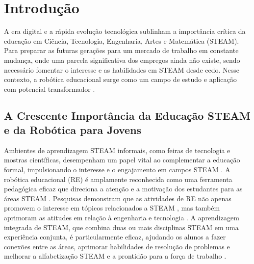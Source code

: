 \documentclass[%
  12pt,%
  a4paper,%
  oneside,%
  openright,%
  sumario = abnt-6027-2012,%
  chapter = TITLE,%
  pretextualoneside,%
  fontetimes,%
  semrecuonosumario,%
  usemakeindex,%
  pardeassinaturas,%
  english,%
  french,%
  spanish,%
  brazil,%
]{utfpr}%
\begin{document}



\textual%



\chapter{Introdução}%
\label{sect:intro}
A era digital e a rápida evolução tecnológica sublinham a importância crítica da educação em Ciência, Tecnologia, Engenharia, Artes e Matemática (STEAM). Para preparar as futuras gerações para um mercado de trabalho em constante mudança, onde uma parcela significativa dos empregos ainda não existe, sendo necessário fomentar o interesse e as habilidades em STEAM desde cedo. Nesse contexto, a robótica educacional surge como um campo de estudo e aplicação com potencial transformador \cite{meegleYouthRobotics2025}.

\section{A Crescente Importância da Educação STEAM e da Robótica para Jovens}
Ambientes de aprendizagem STEAM informais, como feiras de tecnologia e mostras científicas, desempenham um papel vital ao complementar a educação formal, impulsionando o interesse e o engajamento em campos STEAM \cite{ross2024BeyondExhibits}. A robótica educacional (RE) é amplamente reconhecida como uma ferramenta pedagógica eficaz que direciona a atenção e a motivação dos estudantes para as áreas STEAM \cite{cheung2024SummerLibraries}. Pesquisas demonstram que as atividades de RE não apenas promovem o interesse em tópicos relacionados a STEAM \cite{ross2024BeyondExhibits}, mas também aprimoram as atitudes em relação à engenharia e tecnologia \cite{cheung2024SummerLibraries}. A aprendizagem integrada de STEAM, que combina duas ou mais disciplinas STEAM em uma experiência conjunta, é particularmente eficaz, ajudando os alunos a fazer conexões entre as áreas, aprimorar habilidades de resolução de problemas e melhorar a alfabetização STEAM e a prontidão para a força de trabalho \cite{ross2024BeyondExhibits}.
\end{document}
